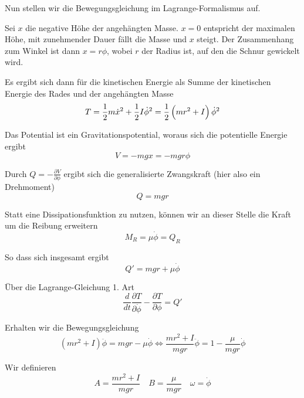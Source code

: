 \documentclass[a4paper,german,12pt,smallheadings]{scrartcl}
\begin{document}
Nun stellen wir die Bewegungsgleichung im Lagrange-Formalismus auf.

Sei $x$ die negative Höhe der angehängten Masse. $x=0$ entspricht der maximalen
Höhe, mit zunehmender Dauer fällt die Masse und $x$ steigt. Der Zusammenhang
zum Winkel ist dann $x = r \phi$, wobei $r$ der Radius ist, auf den die Schnur
gewickelt wird.

Es ergibt sich dann für die kinetischen Energie als Summe der kinetischen
Energie des Rades und der angehängten Masse
\begin{equation}
  T = \frac{1}{2} m \dot{x}^2 + \frac{1}{2} I \dot{\phi}^2 = \frac{1}{2} \del{m r^2 + I} \dot{\phi}^2
\end{equation}

Das Potential ist ein Gravitationspotential, woraus sich die potentielle Energie ergibt
\begin{equation}
  V = -mgx = -mgr \phi
\end{equation}

Durch $Q = -\frac{\partial V}{\partial \phi}$ ergibt sich die generalisierte
Zwangskraft (hier also ein Drehmoment)
\begin{equation}
  Q = mgr
\end{equation}

Statt eine Dissipationsfunktion zu nutzen, können wir an dieser Stelle die
Kraft um die Reibung erweitern
\begin{equation}
  M_R = \mu \dot{\phi} = Q_R
\end{equation}

So dass sich insgesamt ergibt
\begin{equation}
  Q' = mgr + \mu \dot{\phi}
\end{equation}

Über die Lagrange-Gleichung 1. Art
\begin{equation}
  \frac{d}{dt} \frac{\partial T}{\partial \dot{\phi}} - \frac{\partial T}{\partial \phi} = Q'
\end{equation}

Erhalten wir die Bewegungsgleichung
\begin{equation}
  (mr^2+I) \ddot{\phi} = mgr - \mu \dot{\phi} \Leftrightarrow
  \frac{mr^2+I}{mgr} \ddot{\phi} = 1 - \frac{\mu}{mgr} \dot{\phi}
\end{equation}

Wir definieren
\begin{equation*}
  A = \frac{mr^2+I}{mgr} \quad B = \frac{\mu}{mgr} \quad \omega = \dot{\phi}
\end{equation*}
\end{document}
